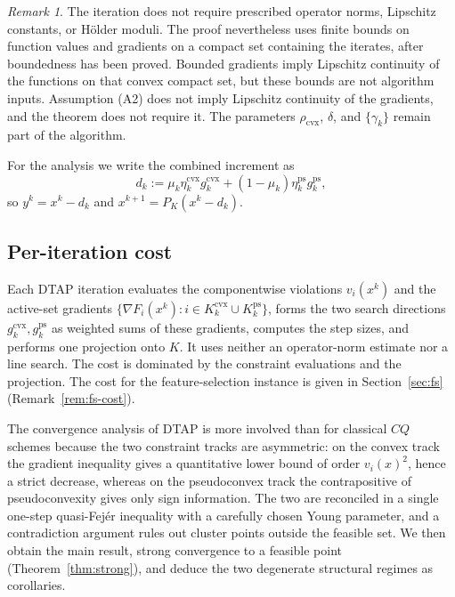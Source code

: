 \documentclass[]{interact}
\theoremstyle{plain}
\theoremstyle{definition}
\theoremstyle{remark}
\newtheorem{remark}{Remark}
\newcommand{\cvx}{\mathrm{cvx}}
\newcommand{\ps}{\mathrm{ps}}
\newcommand{\dtap}{\textsc{DTAP}}
\begin{document}
\begin{remark}\label{rem:regularity-scope}
The iteration does not require prescribed operator norms, Lipschitz constants, or
H\"older moduli. The proof nevertheless uses finite bounds on function values and
gradients on a compact set containing the iterates, after boundedness has been proved.
Bounded gradients imply Lipschitz continuity of the functions on that convex compact set,
but these bounds are not algorithm inputs. Assumption (A2) does not
imply Lipschitz continuity of the gradients, and the theorem does not require it.
The parameters $\rho_{\cvx}$, $\delta$, and $\{\gamma_k\}$ remain part of the algorithm.
\end{remark}

For the analysis we write the combined increment as
\begin{equation}\label{eq:dk}
d_k:=\mu_k\eta^{\cvx}_k g^{\cvx}_k+(1-\mu_k)\eta^{\ps}_k g^{\ps}_k,
\end{equation}
so $y^k=x^k-d_k$ and $x^{k+1}=P_K(x^k-d_k)$.
\subsection{Per-iteration cost}\label{ssec:complexity}
Each \dtap{} iteration evaluates the
componentwise violations $v_i(x^k)$ and the active-set gradients $\{\nabla F_i(x^k):i\in
K^{\cvx}_k\cup K^{\ps}_k\}$, forms the two search directions $g^{\cvx}_k,g^{\ps}_k$ as weighted
sums of these gradients, computes the step sizes, and performs one projection onto $K$.
It uses neither an operator-norm estimate nor a line search. The cost is dominated by
the constraint evaluations and the projection. The cost for the feature-selection instance
is given in Section~\ref{sec:fs}
(Remark~\ref{rem:fs-cost}).

The convergence analysis of \dtap{} is more involved than
for classical $CQ$ schemes because the two constraint tracks are asymmetric: on the
convex track the gradient inequality gives a quantitative lower bound of order
$v_i(x)^2$, hence a strict decrease, whereas on the pseudoconvex track the
contrapositive of pseudoconvexity gives only sign information. The two are reconciled in
a single one-step quasi-Fej\'er inequality with a carefully chosen Young parameter, and a
contradiction argument rules out cluster points outside the feasible set. We then obtain
the main result, strong convergence to a feasible point (Theorem~\ref{thm:strong}), and
deduce the two degenerate structural regimes as corollaries.
\end{document}
